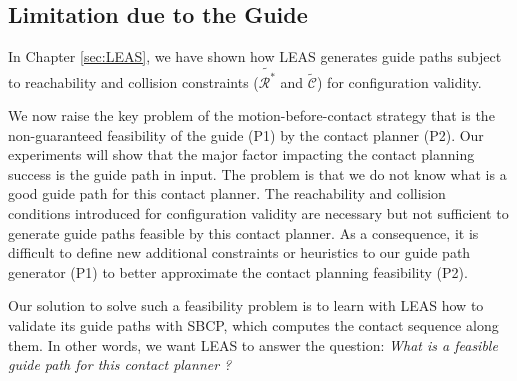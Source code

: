 \subsection{Limitation due to the Guide}

In Chapter \ref{sec:LEAS}, we have shown how LEAS generates guide paths subject to reachability and collision constraints ($\tilde{\mathcal{R}^*}$ and $\tilde{\mathcal{C}}$) for configuration validity. 

We now raise the key problem of the motion-before-contact strategy that is the non-guaranteed feasibility of the guide (P1) by the contact planner (P2).
Our experiments will show that the major factor impacting the contact planning success is the guide path in input.
The problem is that we do not know what is a good guide path for this contact planner. 
The reachability and collision conditions introduced for configuration validity are necessary but not sufficient to generate guide paths feasible by this contact planner. 
As a consequence, it is difficult to define new additional constraints or heuristics to our guide path generator (P1) to better approximate the contact planning feasibility (P2).

Our solution to solve such a feasibility problem is to learn with LEAS how to validate its guide paths with SBCP, which computes the contact sequence along them. In other words, we want LEAS to answer the question: \textit{What is a feasible guide path for this contact planner ?}





